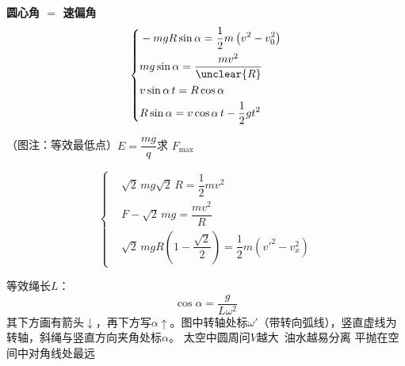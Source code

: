 \textbf{圆心角 $=$ 速偏角}
\[
\left\{\begin{aligned}
&-mgR\sin\alpha=\dfrac12m\left(v^2-v_0^2\right)\\
&mg\sin\alpha=\dfrac{mv^2}{\unclear{R}}\\
&v\sin\alpha\,t=R\cos\alpha\\
&R\sin\alpha=v\cos\alpha\,t-\dfrac12gt^2
\end{aligned}\right.
\]
\begin{problem}
（图注：等效最低点）\quad $E=\dfrac{mg}{q}$\qquad 求 $F_{\max}$
\begin{solution}
\[
\left\{\begin{aligned}
&\sqrt2\,mg\sqrt2\,R=\dfrac12mv^2\\
&F-\sqrt2\,mg=\dfrac{mv^2}{R}\\
&\sqrt2\,mgR\left(1-\dfrac{\sqrt2}{2}\right)=\dfrac12m\left(v'^2-v_x^2\right)
\end{aligned}\right.
\]
\end{solution}
\end{problem}
等效绳长$L$：
\[
\cos\alpha=\frac{g}{L\omega^2}
\]
其下方画有箭头$\downarrow$，再下方写$\alpha\uparrow$。图中转轴处标$\omega'$（带转向弧线），竖直虚线为转轴，斜绳与竖直方向夹角处标$\alpha$。
太空中圆周问\quad $V$越大\ 油水越易分离
平抛在空间中对角线处最远
